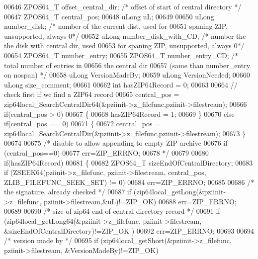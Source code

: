 \begin{DoxyCode}
00646   ZPOS64\_T offset\_central\_dir;   \textcolor{comment}{/* offset of start of central directory */}
00647   ZPOS64\_T central\_pos;
00648   uLong uL;
00649 
00650   uLong number\_disk;          \textcolor{comment}{/* number of the current dist, used for}
00651 \textcolor{comment}{                              spaning ZIP, unsupported, always 0*/}
00652   uLong number\_disk\_with\_CD;  \textcolor{comment}{/* number the the disk with central dir, used}
00653 \textcolor{comment}{                              for spaning ZIP, unsupported, always 0*/}
00654   ZPOS64\_T number\_entry;
00655   ZPOS64\_T number\_entry\_CD;      \textcolor{comment}{/* total number of entries in}
00656 \textcolor{comment}{                                the central dir}
00657 \textcolor{comment}{                                (same than number\_entry on nospan) */}
00658   uLong VersionMadeBy;
00659   uLong VersionNeeded;
00660   uLong size\_comment;
00661 
00662   \textcolor{keywordtype}{int} hasZIP64Record = 0;
00663 
00664   \textcolor{comment}{// check first if we find a ZIP64 record}
00665   central\_pos = zip64local\_SearchCentralDir64(&pziinit->z\_filefunc,pziinit->filestream);
00666   \textcolor{keywordflow}{if}(central\_pos > 0)
00667   \{
00668     hasZIP64Record = 1;
00669   \}
00670   \textcolor{keywordflow}{else} \textcolor{keywordflow}{if}(central\_pos == 0)
00671   \{
00672     central\_pos = zip64local\_SearchCentralDir(&pziinit->z\_filefunc,pziinit->filestream);
00673   \}
00674 
00675 \textcolor{comment}{/* disable to allow appending to empty ZIP archive}
00676 \textcolor{comment}{        if (central\_pos==0)}
00677 \textcolor{comment}{            err=ZIP\_ERRNO;}
00678 \textcolor{comment}{*/}
00679 
00680   \textcolor{keywordflow}{if}(hasZIP64Record)
00681   \{
00682     ZPOS64\_T sizeEndOfCentralDirectory;
00683     \textcolor{keywordflow}{if} (ZSEEK64(pziinit->z\_filefunc, pziinit->filestream, central\_pos, ZLIB\_FILEFUNC\_SEEK\_SET) != 0)
00684       err=ZIP\_ERRNO;
00685 
00686     \textcolor{comment}{/* the signature, already checked */}
00687     \textcolor{keywordflow}{if} (zip64local\_getLong(&pziinit->z\_filefunc, pziinit->filestream,&uL)!=ZIP\_OK)
00688       err=ZIP\_ERRNO;
00689 
00690     \textcolor{comment}{/* size of zip64 end of central directory record */}
00691     \textcolor{keywordflow}{if} (zip64local\_getLong64(&pziinit->z\_filefunc, pziinit->filestream, &sizeEndOfCentralDirectory)!=ZIP\_OK
      )
00692       err=ZIP\_ERRNO;
00693 
00694     \textcolor{comment}{/* version made by */}
00695     \textcolor{keywordflow}{if} (zip64local\_getShort(&pziinit->z\_filefunc, pziinit->filestream, &VersionMadeBy)!=ZIP\_OK)

\end{DoxyCode}
